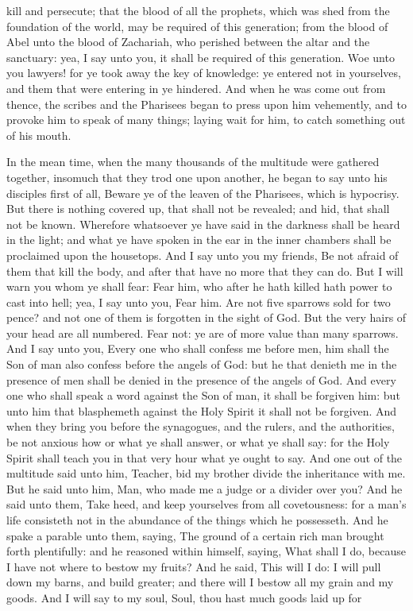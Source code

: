 kill and persecute; that the blood of all the prophets, which was shed from the foundation of the world, may be required of this generation; from the blood of Abel unto the blood of Zachariah, who perished between the altar and the sanctuary: yea, I say unto you, it shall be required of this generation. Woe unto you lawyers! for ye took away the key of knowledge: ye entered not in yourselves, and them that were entering in ye hindered.  And when he was come out from thence, the scribes and the Pharisees began to press upon him vehemently, and to provoke him to speak of many things; laying wait for him, to catch something out of his mouth. 

In the mean time, when the many thousands of the multitude were gathered together, insomuch that they trod one upon another, he began to say unto his disciples first of all, Beware ye of the leaven of the Pharisees, which is hypocrisy. But there is nothing covered up, that shall not be revealed; and hid, that shall not be known. Wherefore whatsoever ye have said in the darkness shall be heard in the light; and what ye have spoken in the ear in the inner chambers shall be proclaimed upon the housetops. And I say unto you my friends, Be not afraid of them that kill the body, and after that have no more that they can do. But I will warn you whom ye shall fear: Fear him, who after he hath killed hath power to cast into hell; yea, I say unto you, Fear him. Are not five sparrows sold for two pence? and not one of them is forgotten in the sight of God. But the very hairs of your head are all numbered. Fear not: ye are of more value than many sparrows. And I say unto you, Every one who shall confess me before men, him shall the Son of man also confess before the angels of God: but he that denieth me in the presence of men shall be denied in the presence of the angels of God. And every one who shall speak a word against the Son of man, it shall be forgiven him: but unto him that blasphemeth against the Holy Spirit it shall not be forgiven. And when they bring you before the synagogues, and the rulers, and the authorities, be not anxious how or what ye shall answer, or what ye shall say: for the Holy Spirit shall teach you in that very hour what ye ought to say.  And one out of the multitude said unto him, Teacher, bid my brother divide the inheritance with me. But he said unto him, Man, who made me a judge or a divider over you? And he said unto them, Take heed, and keep yourselves from all covetousness: for a man’s life consisteth not in the abundance of the things which he possesseth. And he spake a parable unto them, saying, The ground of a certain rich man brought forth plentifully: and he reasoned within himself, saying, What shall I do, because I have not where to bestow my fruits? And he said, This will I do: I will pull down my barns, and build greater; and there will I bestow all my grain and my goods. And I will say to my soul, Soul, thou hast much goods laid up for 